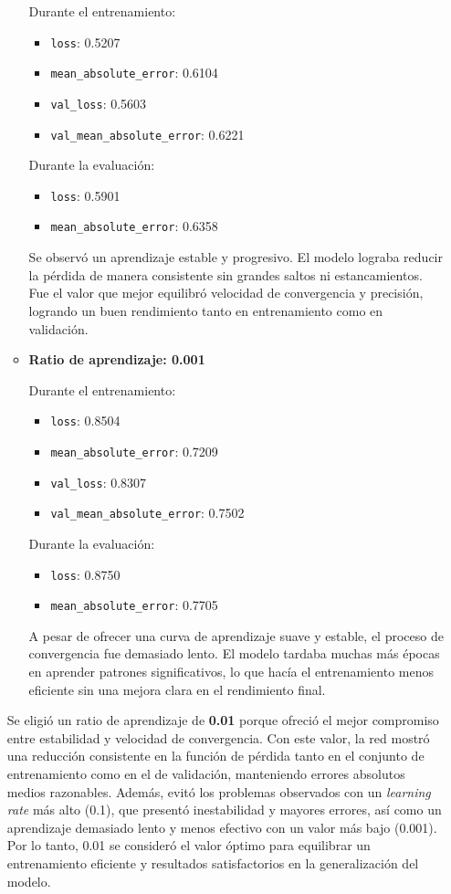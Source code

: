 \documentclass[conference,a4paper]{IEEEtran}
\begin{document}
\begin{itemize}
\begin{itemize}
    Durante el entrenamiento:
    \begin{itemize}
        \item \texttt{loss}: 0.5207
        \item \texttt{mean\_absolute\_error}: 0.6104
        \item \texttt{val\_loss}: 0.5603
        \item \texttt{val\_mean\_absolute\_error}: 0.6221
    \end{itemize}
    Durante la evaluación:
    \begin{itemize}
        \item \texttt{loss}: 0.5901
        \item \texttt{mean\_absolute\_error}: 0.6358
    \end{itemize}
    
    Se observó un aprendizaje estable y progresivo. El modelo lograba reducir la pérdida de manera consistente sin grandes saltos ni estancamientos. Fue el valor que mejor equilibró velocidad de convergencia y precisión, logrando un buen rendimiento tanto en entrenamiento como en validación.

    \item \textbf{Ratio de aprendizaje: 0.001}

    Durante el entrenamiento:
    \begin{itemize}
        \item \texttt{loss}: 0.8504
        \item \texttt{mean\_absolute\_error}: 0.7209
        \item \texttt{val\_loss}: 0.8307
        \item \texttt{val\_mean\_absolute\_error}: 0.7502
    \end{itemize}
    Durante la evaluación:
    \begin{itemize}
        \item \texttt{loss}: 0.8750
        \item \texttt{mean\_absolute\_error}: 0.7705
    \end{itemize}
    
    A pesar de ofrecer una curva de aprendizaje suave y estable, el proceso de convergencia fue demasiado lento. El modelo tardaba muchas más épocas en aprender patrones significativos, lo que hacía el entrenamiento menos eficiente sin una mejora clara en el rendimiento final.
\end{itemize}

Se eligió un ratio de aprendizaje de \textbf{0.01} porque ofreció el mejor compromiso entre estabilidad y velocidad de convergencia. Con este valor, la red mostró una reducción consistente en la función de pérdida tanto en el conjunto de entrenamiento como en el de validación, manteniendo errores absolutos medios razonables. Además, evitó los problemas observados con un \textit{learning rate} más alto (0.1), que presentó inestabilidad y mayores errores, así como un aprendizaje demasiado lento y menos efectivo con un valor más bajo (0.001). Por lo tanto, 0.01 se consideró el valor óptimo para equilibrar un entrenamiento eficiente y resultados satisfactorios en la generalización del modelo.


\end{itemize}
\end{document}

